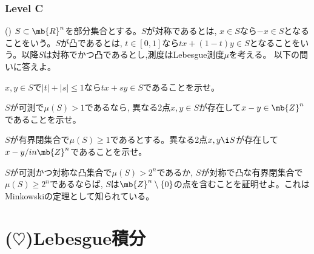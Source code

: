 \subsubsection{Level C}
\begin{prob} ()
$S\subset \mb{R}^{n}$を部分集合とする。$S$が対称であるとは, $x\in S$なら$-x\in S$となることをいう。$S$が凸であるとは, $t\in [0,1]$なら$tx + (1-t)y\in S$となることをいう。以降$S$は対称でかつ凸であるとし,測度はLebesgue測度$\mu$を考える。 以下の問いに答えよ。
\ben
\item $x,y\in S$で$|t| + |s| \leq 1$なら$tx + sy \in S$であることを示せ。
\item $S$が可測で$\mu(S) > 1$であるなら, 異なる2点$x,y\in S$が存在して$x-y \in \mb{Z}^{n}$であることを示せ。
\item $S$が有界閉集合で$\mu(S)\geq 1$であるとする。異なる2点$x,y\i S$が存在して$x-y/in \mb{Z}^{n}$であることを示せ。
\item $S$が可測かつ対称な凸集合で$\mu(S) > 2^{n}$であるか, $S$が対称で凸な有界閉集合で$\mu(S) \geq 2^{n}$であるならば, $S$は$\mb{Z}^{n}\setminus{\{ 0 \}}$の点を含むことを証明せよ。これはMinkowskiの定理として知られている。
\een
\end{prob}





\section{($\heartsuit$)Lebesgue積分}
